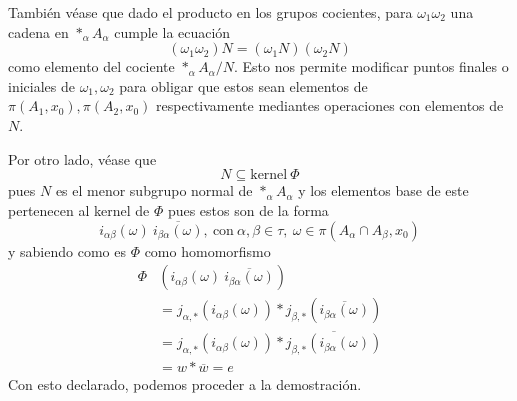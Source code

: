 También véase que dado el producto en los
grupos cocientes, para \(\omega_1 \omega_2 \) una cadena en \(*_\alpha
A_\alpha\) cumple la ecuación
\[ (\omega_1 \omega_2) N = (\omega_1 N) (\omega_2 N) \]
como elemento del cociente \(*_\alpha A_\alpha / N\). Esto nos permite
modificar puntos finales o iniciales de \(\omega_1, \omega_2\) para
obligar que estos sean elementos de \(\pi (A_1, x_0), \pi (A_2, x_0)\)
respectivamente mediantes operaciones con elementos de \(N\).

Por otro lado, véase que
\[ N \subseteq \text{kernel} \ \Phi \]
pues \(N\) es el menor subgrupo normal de \(*_\alpha A_\alpha\) y los
elementos base de este pertenecen al kernel de \(\Phi\) pues estos son
de la forma
\[ i_{\alpha \beta} (\omega) \ \overline{i_{\beta \alpha} (\omega)} ,
  \ \text{con} \ \alpha,\beta \in \tau,\ \omega \in \pi(A_\alpha \cap
  A_\beta , x_0)\]
y sabiendo como es \(\Phi\) como homomorfismo
\begin{align*}
  \Phi &\left( i_{\alpha \beta} (\omega) \ \overline{i_{\beta \alpha}
          (\omega)} \right) \\
       &= j_{\alpha,*} \left( i_{\alpha \beta} (\omega) \right) *
         j_{\beta,*} \left( \overline{i_{\beta \alpha} (\omega)} \right) \\
       &= j_{\alpha,*} \left( i_{\alpha \beta} (\omega) \right) *
         \overline{j_{\beta,*} \left( i_{\beta \alpha} (\omega) \right)} \\
       &= w * \overline{w} = e
\end{align*}
Con esto
declarado, podemos proceder a la demostración.
